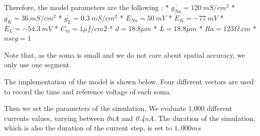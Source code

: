 \documentclass[]{article}
\newenvironment{Shaded}{}{}
\newcommand{\BuiltInTok}[1]{#1}
\newcommand{\CommentTok}[1]{\textcolor[rgb]{0.38,0.63,0.69}{\textit{#1}}}
\newcommand{\ControlFlowTok}[1]{\textcolor[rgb]{0.00,0.44,0.13}{\textbf{#1}}}
\newcommand{\DecValTok}[1]{\textcolor[rgb]{0.25,0.63,0.44}{#1}}
\newcommand{\FloatTok}[1]{\textcolor[rgb]{0.25,0.63,0.44}{#1}}
\newcommand{\KeywordTok}[1]{\textcolor[rgb]{0.00,0.44,0.13}{\textbf{#1}}}
\newcommand{\NormalTok}[1]{#1}
\newcommand{\OperatorTok}[1]{\textcolor[rgb]{0.40,0.40,0.40}{#1}}
\newcommand{\SpecialCharTok}[1]{\textcolor[rgb]{0.25,0.44,0.63}{#1}}
\newcommand{\StringTok}[1]{\textcolor[rgb]{0.25,0.44,0.63}{#1}}
\begin{document}
Therefore, the model parameters are the following : *
\(\bar{g_{Na}} =120\ mS/cm^2\) * \(\bar{g_K} = 36\ mS/cm^2\) *
\(\bar{g_L} = 0.3\ mS/cm^2\) * \(E_{Na} = 50\ mV\) * \(E_K = -77\ mV\) *
\(E_L = -54.3\ mV\) * \(C_m = 1\mu  f/cm2\) * \(d = 18.8\mu m\) *
\(L = 18.8\mu m\) * \(Ra = 123\Omega.cm\) * \(nseg = 1\)

Note that, as the soma is small and we do not care about spatial
accuracy, we only use one segment.

The implementation of the model is shown below. Four different vectors
are used to record the time and reference voltage of each soma.

\begin{Shaded}
\end{Shaded}

Then we set the parameters of the simulation. We evaluate 1,000
different currents values, varying between \emph{0nA} and \emph{0.4nA}.
The duration of the simulation, which is also the duration of the
current step, is set to \(1,000ms\)
\end{document}
